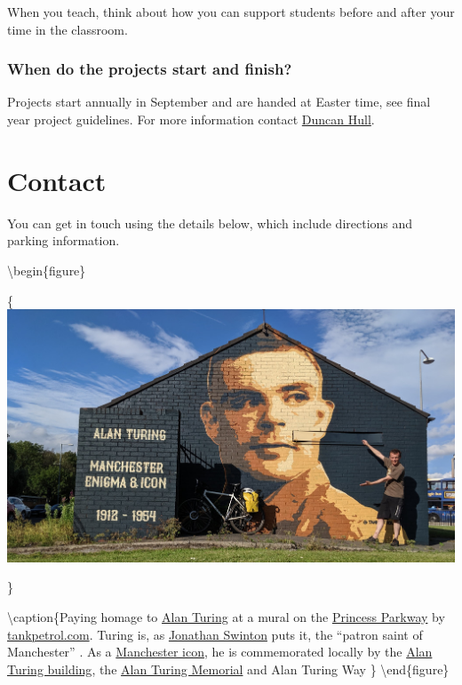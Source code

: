 \documentclass[
  12pt,
]{book}
\begin{document}
When you teach, think about how you can support students before and after your time in the classroom.

\hypertarget{finishing}{%
\subsection{When do the projects start and finish?}\label{finishing}}

Projects start annually in September and are handed at Easter time, see final year project guidelines. For more information contact \protect\hyperlink{Contact}{Duncan Hull}.

\hypertarget{contact}{%
\chapter{Contact}\label{contact}}

You can get in touch using the details below, which include directions and parking information.

\textbackslash begin\{figure\}

\{\centering \includegraphics[width=1\linewidth]{images/turingicon}

\}

\textbackslash caption\{Paying homage to \href{https://en.wikipedia.org/wiki/Alan_Turing}{Alan Turing} at a mural on the \href{https://en.wikipedia.org/wiki/A5103_road}{Princess Parkway} by \href{http://tankpetrol.com/}{tankpetrol.com}. Turing is, as \href{https://www.manturing.net/jonathan}{Jonathan Swinton} puts it, the ``patron saint of Manchester'' \citep{manturing}. As a \href{https://en.wikipedia.org/wiki/Symbols_of_Manchester}{Manchester icon}, he is commemorated locally by the \href{https://en.wikipedia.org/wiki/Alan_Turing_Building}{Alan Turing building}, the \href{https://en.wikipedia.org/wiki/Alan_Turing_Memorial}{Alan Turing Memorial} and Alan Turing Way \citep{turingway}\}\label{fig:unnamed-chunk-9}
\textbackslash end\{figure\}
\end{document}
